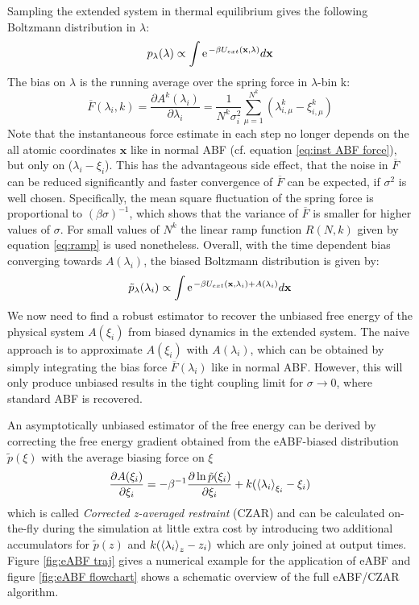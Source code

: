Sampling the extended system in thermal equilibrium gives the following Boltzmann distribution in $\lambda$:
\begin{equation}
  p_\lambda(\lambda) \propto \int \e^{-\beta U_{ext}(\textbf{x},\lambda)} d\textbf{x} \\
\end{equation}
The bias on $\lambda$ is the running average over the spring force in $\lambda$-bin k:
\begin{equation}
  \overline{F}(\lambda_{i}, k) = \frac{\partial A^{k}(\lambda_{i})}{\partial \lambda_i} = \frac{1}{N^{k}\sigma_i^2} \sum_{\mu=1}^{N^{k}} (\lambda_{i,\mu}^{k}-\xi_{i,\mu}^{k})
  \label{eq:eABF bias}
\end{equation}
Note that the instantaneous force estimate in each step no longer depends on the all atomic coordinates $\textbf{x}$ like in normal ABF (cf. equation \ref{eq:inst ABF force}), but only on ($\lambda_i - \xi_i$).
This has the advantageous side effect, that the noise in $\overline{F}$ can be reduced significantly and faster convergence of $\overline{F}$ can be expected, if $\sigma^2$ is well chosen.\autocite{lesage2017smoothed} Specifically, the mean square fluctuation of the spring force is proportional to $(\beta\sigma)^{-1}$, which shows that the variance of $\overline{F}$ is smaller for higher values of $\sigma$.
For small values of $N^{k}$ the linear ramp function $R(N,k)$ given by equation \ref{eq:ramp} is used nonetheless. Overall, with the time dependent bias converging towards $A(\lambda_{i})$, the biased Boltzmann distribution is given by:
\begin{equation}
  \tilde{p}_\lambda(\lambda_i) \propto \int \e^{-\beta U_{ext}(\textbf{x},\lambda_i) + A(\lambda_i)} d\textbf{x}
\end{equation}
We now need to find a robust estimator to recover the unbiased free energy of the physical system $A(\xi_i)$ from biased dynamics in the extended system.
The naive approach is to approximate $A(\xi_i)$ with $A(\lambda_i)$, which can be obtained by simply integrating the bias force $\overline{F}(\lambda_{i})$ like in normal ABF.
However, this will only produce unbiased results in the tight coupling limit for $\sigma \rightarrow 0$, where standard ABF is recovered.

An asymptotically unbiased estimator of the free energy can be derived by correcting the free energy gradient obtained from the eABF-biased distribution $\tilde{p}(\xi)$ with the average biasing force on $\xi$
\begin{equation}
  \frac{\partial A(\xi_i)}{\partial \xi_i} = -\beta^{-1}\frac{\partial \ln \tilde{p}(\xi_i)}{\partial \xi_i} + k(\braket{\lambda_i}_{\xi_i}-\xi_{i}) \label{eq:CZAR}
\end{equation}
which is called \textit{Corrected z-averaged restraint} (CZAR) and can be calculated on-the-fly during the simulation at little extra cost by introducing two additional accumulators for $\tilde{p}(z)$ and $k(\braket{\lambda_i}_{z}-z_{i})$ which are only joined at output times.\autocite{lesage2017smoothed} Figure \ref{fig:eABF traj} gives a numerical example for the application of eABF and figure \ref{fig:eABF flowchart} shows a schematic overview of the full eABF/CZAR algorithm.

